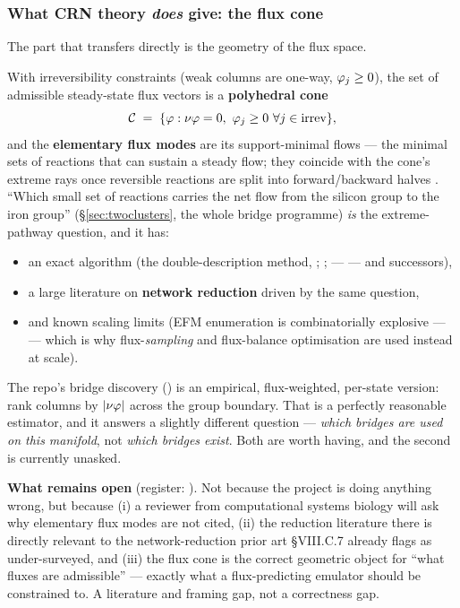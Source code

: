 \subsubsection{What CRN theory \emph{does} give: the flux cone}
\label{sec:fluxcone}

The part that transfers directly is the geometry of the flux space.

With irreversibility constraints (weak columns are one-way, $\varphi_j \ge 0$),
the set of admissible steady-state flux vectors is a \textbf{polyhedral cone}
%
\begin{equation}
\mathcal{C} \;=\; \{\varphi : \nu\varphi = 0,\
                   \varphi_j \ge 0 \ \forall j \in \text{irrev}\},
\label{eq:fluxcone}
\end{equation}
%
and the \textbf{elementary flux modes} are its support-minimal flows --- the
minimal sets of reactions that can sustain a steady flow; they coincide with the
cone's extreme rays once reversible reactions are split into forward/backward
halves \citep{gagneur2004}. ``Which small set of reactions carries the net flow
from the silicon group to the iron group'' (\S\ref{sec:twoclusters}, the whole
bridge programme) \emph{is} the extreme-pathway question, and it has:

\begin{itemize}
\item an exact algorithm (the double-description method, \citealp{motzkin1953};
  \citealp{fukuda1996}; \code{efmtool} --- \citealp{terzer2008} --- and
  successors),
\item a large literature on \textbf{network reduction} driven by the same
  question,
\item and known scaling limits (EFM enumeration is combinatorially explosive ---
  \citealp{klamt2002} --- which is why flux-\emph{sampling} and flux-balance
  optimisation are used instead at scale).
\end{itemize}

The repo's bridge discovery () is an empirical,
flux-weighted, per-state version: rank columns by $|\nu\varphi|$ across the
group boundary. That is a perfectly reasonable estimator, and it answers a
slightly different question --- \emph{which bridges are used on this manifold},
not \emph{which bridges exist}. Both are worth having, and the second is
currently unasked.

\textbf{What remains open} (register: ). Not because the project is
doing anything wrong, but because (i) a reviewer from computational systems
biology will ask why elementary flux modes are not cited, (ii) the reduction
literature there is directly relevant to the network-reduction prior art
\code{tier1.md} \S VIII.C.7 already flags as under-surveyed, and (iii) the flux
cone is the correct geometric object for ``what fluxes are admissible'' ---
exactly what a flux-predicting emulator should be constrained to. A literature
and framing gap, not a correctness gap.

